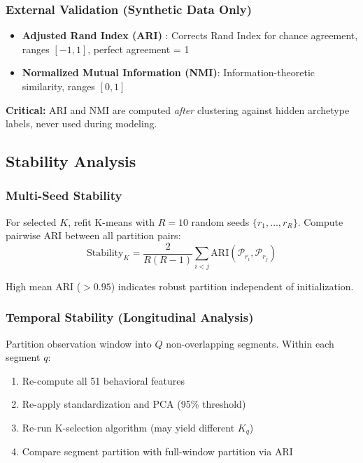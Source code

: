 \subsubsection{External Validation (Synthetic Data Only)}

\begin{itemize}
    \item \textbf{Adjusted Rand Index (ARI)} \cite{gates2019adjusted}: Corrects Rand Index for chance agreement, ranges $[-1, 1]$, perfect agreement = 1
    \item \textbf{Normalized Mutual Information (NMI)}: Information-theoretic similarity, ranges $[0, 1]$
\end{itemize}

\textbf{Critical:} ARI and NMI are computed \emph{after} clustering against hidden archetype labels, never used during modeling.

\subsection{Stability Analysis}
\label{sec:stability}

\subsubsection{Multi-Seed Stability}

For selected $K$, refit K-means with $R=10$ random seeds $\{r_1, \ldots, r_R\}$. Compute pairwise ARI between all partition pairs:
\begin{equation}
\text{Stability}_K = \frac{2}{R(R-1)} \sum_{i < j} \text{ARI}(\mathcal{P}_{r_i}, \mathcal{P}_{r_j})
\end{equation}

High mean ARI ($> 0.95$) indicates robust partition independent of initialization.

\subsubsection{Temporal Stability (Longitudinal Analysis)}

Partition observation window into $Q$ non-overlapping segments. Within each segment $q$:
\begin{enumerate}
    \item Re-compute all 51 behavioral features
    \item Re-apply standardization and PCA (95\% threshold)
    \item Re-run K-selection algorithm (may yield different $K_q$)
    \item Compare segment partition with full-window partition via ARI
\end{enumerate}

